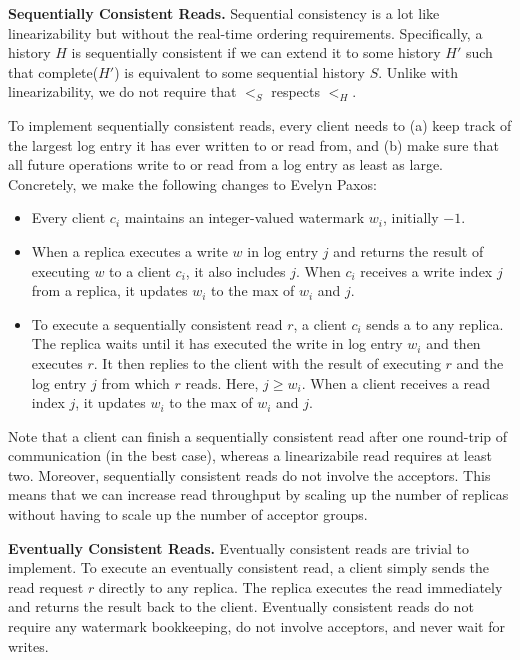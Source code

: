 \textbf{Sequentially Consistent Reads.}
Sequential consistency is a lot like linearizability but without the real-time
ordering requirements. Specifically, a history $H$ is sequentially consistent
if we can extend it to some history $H'$ such that complete($H'$) is equivalent
to some sequential history $S$. Unlike with linearizability, we do not require
that $<_S$ respects $<_H$.

To implement sequentially consistent reads, every client needs to (a) keep
track of the largest log entry it has ever written to or read from, and (b)
make sure that all future operations write to or read from a log entry as least
as large.  Concretely, we make the following changes to Evelyn Paxos:
\begin{itemize}
  \item
    Every client $c_i$ maintains an integer-valued watermark $w_i$, initially
    $-1$.
  \item
    When a replica executes a write $w$ in log entry $j$ and returns the result
    of executing $w$ to a client $c_i$, it also includes $j$. When $c_i$
    receives a write index $j$ from a replica, it updates $w_i$ to the max of
    $w_i$ and $j$.
  \item
    To execute a sequentially consistent read $r$, a client $c_i$ sends a
     to any replica. The replica waits until it has executed
    the write in log entry $w_i$ and then executes $r$. It then replies to the
    client with the result of executing $r$ and the log entry $j$ from which
    $r$ reads. Here, $j \geq w_i$. When a client receives a read index $j$, it
    updates $w_i$ to the max of $w_i$ and $j$.
\end{itemize}

Note that a client can finish a sequentially consistent read after one
round-trip of communication (in the best case), whereas a linearizabile read
requires at least two. Moreover, sequentially consistent reads do not involve
the acceptors. This means that we can increase read throughput by scaling up
the number of replicas without having to scale up the number of acceptor groups.

\textbf{Eventually Consistent Reads.}
Eventually consistent reads are trivial to implement. To execute an eventually
consistent read, a client simply sends the read request $r$ directly to any
replica. The replica executes the read immediately and returns the result back
to the client. Eventually consistent reads do not require any watermark
bookkeeping, do not involve acceptors, and never wait for writes.
